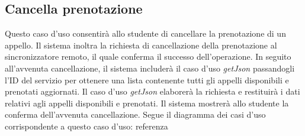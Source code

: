 \newpage
	

	
	
	\begin{table}[tb]
			\subsection{ Cancella prenotazione  }
		Questo caso d’uso consentirà allo studente di cancellare la prenotazione di un appello. Il sistema inoltra la richiesta di cancellazione della prenotazione al sincronizzatore remoto, il quale conferma il successo dell’operazione. In seguito all'avvenuta cancellazione, il sistema includerà il caso d’uso \textit{getJson} passandogli l’ID del servizio per ottenere una lista contenente tutti gli appelli disponibili e prenotati aggiornati. Il caso d’uso \textit{getJson} elaborerà la richiesta e restituirà i dati relativi agli appelli disponibili e prenotati. Il sistema mostrerà allo studente la conferma dell’avvenuta cancellazione. Segue il diagramma dei casi d'uso corrispondente a questo caso d'uso: referenza
		\small %
		

\end{table}

